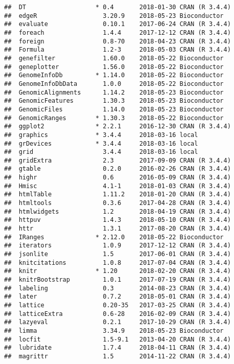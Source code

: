 \documentclass[]{article}
\begin{document}
\begin{verbatim}
##  DT                   * 0.4       2018-01-30 CRAN (R 3.4.4)
##  edgeR                  3.20.9    2018-05-23 Bioconductor  
##  evaluate               0.10.1    2017-06-24 CRAN (R 3.4.4)
##  foreach                1.4.4     2017-12-12 CRAN (R 3.4.4)
##  foreign                0.8-70    2018-04-23 CRAN (R 3.4.4)
##  Formula                1.2-3     2018-05-03 CRAN (R 3.4.4)
##  genefilter             1.60.0    2018-05-22 Bioconductor  
##  geneplotter            1.56.0    2018-05-22 Bioconductor  
##  GenomeInfoDb         * 1.14.0    2018-05-22 Bioconductor  
##  GenomeInfoDbData       1.0.0     2018-05-22 Bioconductor  
##  GenomicAlignments      1.14.2    2018-05-23 Bioconductor  
##  GenomicFeatures        1.30.3    2018-05-23 Bioconductor  
##  GenomicFiles           1.14.0    2018-05-23 Bioconductor  
##  GenomicRanges        * 1.30.3    2018-05-22 Bioconductor  
##  ggplot2              * 2.2.1     2016-12-30 CRAN (R 3.4.4)
##  graphics             * 3.4.4     2018-03-16 local         
##  grDevices            * 3.4.4     2018-03-16 local         
##  grid                   3.4.4     2018-03-16 local         
##  gridExtra              2.3       2017-09-09 CRAN (R 3.4.4)
##  gtable                 0.2.0     2016-02-26 CRAN (R 3.4.4)
##  highr                  0.6       2016-05-09 CRAN (R 3.4.4)
##  Hmisc                  4.1-1     2018-01-03 CRAN (R 3.4.4)
##  htmlTable              1.11.2    2018-01-20 CRAN (R 3.4.4)
##  htmltools              0.3.6     2017-04-28 CRAN (R 3.4.4)
##  htmlwidgets            1.2       2018-04-19 CRAN (R 3.4.4)
##  httpuv                 1.4.3     2018-05-10 CRAN (R 3.4.4)
##  httr                   1.3.1     2017-08-20 CRAN (R 3.4.4)
##  IRanges              * 2.12.0    2018-05-22 Bioconductor  
##  iterators              1.0.9     2017-12-12 CRAN (R 3.4.4)
##  jsonlite               1.5       2017-06-01 CRAN (R 3.4.4)
##  knitcitations          1.0.8     2017-07-04 CRAN (R 3.4.4)
##  knitr                * 1.20      2018-02-20 CRAN (R 3.4.4)
##  knitrBootstrap         1.0.1     2017-07-19 CRAN (R 3.4.4)
##  labeling               0.3       2014-08-23 CRAN (R 3.4.4)
##  later                  0.7.2     2018-05-01 CRAN (R 3.4.4)
##  lattice                0.20-35   2017-03-25 CRAN (R 3.4.4)
##  latticeExtra           0.6-28    2016-02-09 CRAN (R 3.4.4)
##  lazyeval               0.2.1     2017-10-29 CRAN (R 3.4.4)
##  limma                  3.34.9    2018-05-23 Bioconductor  
##  locfit                 1.5-9.1   2013-04-20 CRAN (R 3.4.4)
##  lubridate              1.7.4     2018-04-11 CRAN (R 3.4.4)
##  magrittr               1.5       2014-11-22 CRAN (R 3.4.4)

\end{verbatim}
\end{document}
